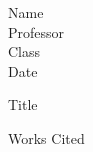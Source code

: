 \documentclass[12pt]{article}
\newcommand{\bibent}{\noindent \hangindent 40pt}
\newenvironment{workscited}{\newpage \begin{center} Works Cited \end{center}}{\newpage }
\begin{document}
    \begin{flushleft}
Name \\
Professor \\
Class \\
Date \\ %
\begin{center}
Title
\end{center}
\setlength{\parindent}{0.5in}

\begin{workscited}
    \bibent
\end{workscited}
\end{flushleft}
\end{document}
